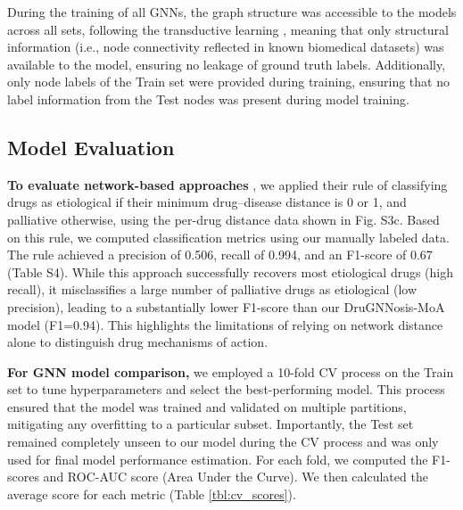 \documentclass[journal,twoside,web]{ieeecolor}
\begin{document}
During the training of all GNNs, the graph structure was accessible to the models across all sets, following the transductive learning \cite{mishra2020node}, meaning that only structural information (i.e., node connectivity reflected in known biomedical datasets) was available to the model, ensuring no leakage of ground truth labels. 
Additionally, only node labels of the Train set were provided during training, ensuring that no label information from the Test nodes was present during model training.

\subsection{Model Evaluation}
\textbf{To evaluate network-based approaches} \cite{yildirim2007drug,guney2016network}, we applied their rule of classifying drugs as etiological if their minimum drug–disease distance is 0 or 1, and palliative otherwise, using the per-drug distance data shown in Fig. S3c.
Based on this rule, we computed classification metrics using our manually labeled data. The rule achieved a precision of 0.506, recall of 0.994, and an F1-score of 0.67 (Table S4).
While this approach successfully recovers most etiological drugs (high recall), it misclassifies a large number of palliative drugs as etiological (low precision), leading to a substantially lower F1-score than our DruGNNosis-MoA model (F1=0.94). This highlights the limitations of relying on network distance alone to distinguish drug mechanisms of action.

\textbf{For GNN model comparison,} we employed a 10-fold CV process on the Train set to tune hyperparameters and select the best-performing model. 
This process ensured that the model was trained and validated on multiple partitions, mitigating any overfitting to a particular subset. 
Importantly, the Test set remained completely unseen to our model during the CV process and was only used for final model performance estimation. 
For each fold, we computed the F1-scores and ROC-AUC score (Area Under the Curve). 
We then calculated the average score for each metric (Table \ref{tbl:cv_scores}).
\end{document}
